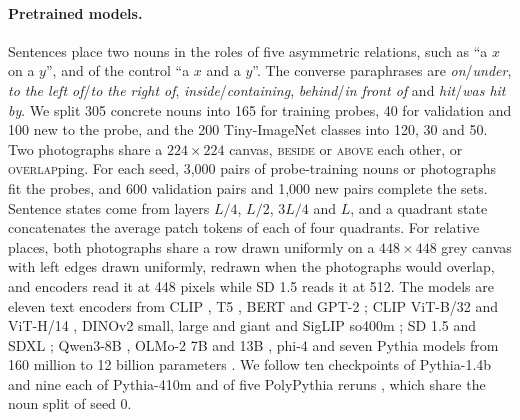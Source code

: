 \paragraph{Pretrained models.} Sentences place two nouns in the roles of five asymmetric relations, such as ``a $x$ on a $y$'', and of the control ``a $x$ and a $y$''. The converse paraphrases are \emph{on}/\emph{under}, \emph{to the left of}/\emph{to the right of}, \emph{inside}/\emph{containing}, \emph{behind}/\emph{in front of} and \emph{hit}/\emph{was hit by}. We split 305 concrete nouns into 165 for training probes, 40 for validation and 100 new to the probe, and the 200 Tiny-ImageNet classes \citep{le2015tiny} into 120, 30 and 50. Two photographs share a $224 \times 224$ canvas, \textsc{beside} or \textsc{above} each other, or \textsc{overlap}ping. For each seed, 3{,}000 pairs of probe-training nouns or photographs fit the probes, and 600 validation pairs and 1{,}000 new pairs complete the sets. Sentence states come from layers $L/4$, $L/2$, $3L/4$ and $L$, and a quadrant state concatenates the average patch tokens of each of four quadrants. For relative places, both photographs share a row drawn uniformly on a $448 \times 448$ grey canvas with left edges drawn uniformly, redrawn when the photographs would overlap, and encoders read it at 448 pixels while SD 1.5 reads it at 512. The models are eleven text encoders from CLIP \citep{radford2021clip}, T5 \citep{raffel2020t5}, BERT \citep{devlin2019bert} and GPT-2 \citep{radford2019gpt2}; CLIP ViT-B/32 and ViT-H/14 \citep{radford2021clip,cherti2023}, DINOv2 small, large and giant \citep{oquab2024dinov2} and SigLIP so400m \citep{zhai2023siglip}; SD 1.5 and SDXL \citep{rombach2022}; Qwen3-8B \citep{yang2025qwen3}, OLMo-2 7B and 13B \citep{olmo2024olmo2}, phi-4 \citep{abdin2024phi4} and seven Pythia models from 160 million to 12 billion parameters \citep{biderman2023pythia}. We follow ten checkpoints of Pythia-1.4b and nine each of Pythia-410m and of five PolyPythia reruns \citep{vanderwal2025polypythias}, which share the noun split of seed 0.

